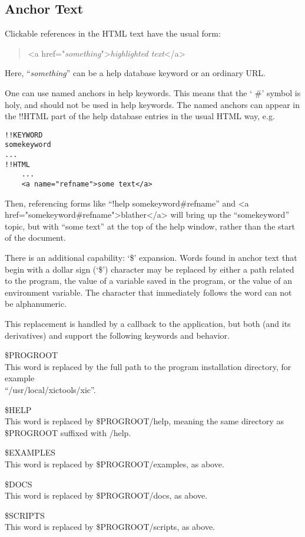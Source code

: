 \subsection{Anchor Text}

Clickable references in the HTML text have the usual form:
\begin{quote}
{\vt <a href="{\it something}">{\it highlighted text}</a>}
\end{quote}
Here, ``{\it something}'' can be a help database keyword or an
ordinary URL.

One can use named anchors in help keywords.  This means that the `{\vt
\#}' symbol is holy, and should not be used in help keywords.  The
named anchors can appear in the {\vt !!HTML} part of the help database
entries in the usual HTML way, e.g.

\begin{verbatim}
!!KEYWORD
somekeyword
...
!!HTML
    ...
    <a name="refname">some text</a>
\end{verbatim}

\begin{flushleft}
Then, referencing forms like ``{\vt !help somekeyword\#refname}'' and
{\vt <a href="somekeyword\#refname">blather</a>} will bring up the
``somekeyword'' topic, but with ``some text'' at the top of the help
window, rather than the start of the document.
\end{flushleft}

There is an additional capability:  `{\vt \$}' expansion.  Words found
in anchor text that begin with a dollar sign (`{\vt \$}') character
may be replaced by either a path related to the program, the value of
a variable saved in the program, or the value of an environment
variable.  The character that immediately follows the word can not be
alphanumeric.

This replacement is handled by a callback to the application, but both
{\Xic} (and its derivatives) and {\WRspice} support the following
keywords and behavior.

\begin{description}
\item{\vt \$PROGROOT}\\
This word is replaced by the full path to the program installation
directory, for example\\ ``{\vt /usr/local/xictools/xic}''.
\item{\vt \$HELP}\\
This word is replaced by {\vt \$PROGROOT/help}, meaning the same
directory as {\vt \$PROGROOT} suffixed with {\vt /help}.
\item{\vt \$EXAMPLES}\\
This word is replaced by {\vt \$PROGROOT/examples}, as above.
\item{\vt \$DOCS}\\
This word is replaced by {\vt \$PROGROOT/docs}, as above.
\item{\vt \$SCRIPTS}\\
This word is replaced by {\vt \$PROGROOT/scripts}, as above.
\end{description}

